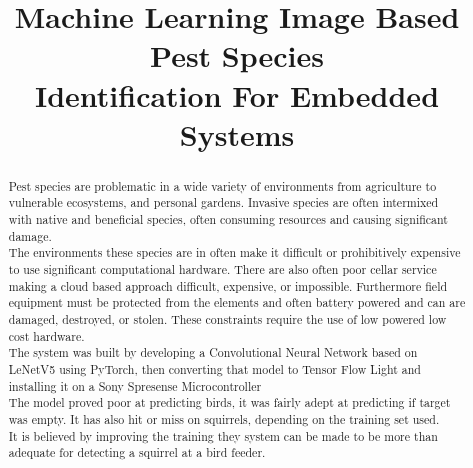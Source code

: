 \documentclass[conference]{IEEEtran}
\begin{document}
\title{	Machine Learning Image Based Pest Species\\Identification For Embedded Systems}

\author{


}

\maketitle

\begin{abstract}

	Pest species are problematic in a wide variety of environments from agriculture to vulnerable ecosystems, and personal gardens. Invasive species are often intermixed with native and beneficial species, often consuming resources and causing significant damage.\\
	
	The environments these species are in often make it difficult or prohibitively expensive to use significant computational hardware. There are also often poor cellar service making a cloud based approach difficult, expensive, or impossible. Furthermore field equipment must be protected from the elements and often battery powered and can are damaged, destroyed, or stolen. These constraints require the use of low powered low cost hardware. \\
	
The system was built by developing a Convolutional Neural Network based on LeNetV5 using PyTorch, then converting that model to Tensor Flow Light and installing it on a Sony Spresense Microcontroller \\

The model proved poor at predicting birds, it was fairly adept at predicting if target was empty. It has also hit or miss on squirrels, depending on the training set used. \\
It is believed by improving the training they system can be made to be more than adequate for detecting a squirrel at a bird feeder.
\end{abstract}
\end{document}
